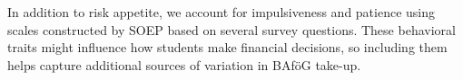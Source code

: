 In addition to risk appetite, we account for impulsiveness and patience using scales constructed by SOEP based on several survey questions. These behavioral traits might influence how students make financial decisions, so including them helps capture additional sources of variation in BAföG take-up.




